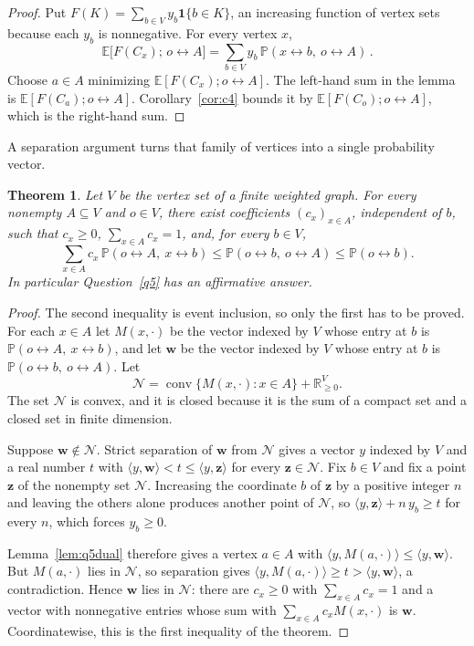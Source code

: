 \documentclass[11pt]{article}
\newtheorem{theorem}{Theorem}[section]
\theoremstyle{definition}
\theoremstyle{remark}
\newcommand{\PP}{\mathbb P}
\newcommand{\EE}{\mathbb E}
\newcommand{\one}{\mathbf 1}
\newcommand{\con}{\leftrightarrow}
\begin{document}
\begin{proof}
Put $F(K)=\sum_{b\in V}y_b\one\{b\in K\}$, an increasing function of vertex sets because
each $y_b$ is nonnegative. For every vertex $x$,
\[
 \EE\bigl[F(C_x);\,o\con A\bigr]=\sum_{b\in V}y_b\,\PP(x\con b,\ o\con A)\,.
\]
Choose $a\in A$ minimizing $\EE[F(C_x);o\con A]$. The left-hand sum in the lemma is
$\EE[F(C_a);o\con A]$. Corollary~\ref{cor:c4} bounds it by
$\EE[F(C_o);o\con A]$, which is the right-hand sum.
\end{proof}

A separation argument turns that family of vertices into a single probability vector.

\begin{theorem}\label{thm:q5}
Let $V$ be the vertex set of a finite weighted graph. For every nonempty
$A\subseteq V$ and $o\in V$, there exist coefficients $(c_x)_{x\in A}$, independent of
$b$, such that $c_x\geq0$, $\sum_{x\in A}c_x=1$, and, for every $b\in V$,
\[
 \sum_{x\in A}c_x\,\PP(o\con A,\ x\con b)
 \leq \PP(o\con b,\ o\con A)\leq \PP(o\con b).
\]
In particular Question~\ref{q5} has an affirmative answer.
\end{theorem}

\begin{proof}
The second inequality is event inclusion, so only the first has to be proved. For each
$x\in A$ let $M(x,\cdot)$ be the vector indexed by $V$ whose entry at $b$ is $\PP(o\con A,\
x\con b)$, and let $\mathbf w$ be the vector indexed by $V$ whose entry at $b$ is
$\PP(o\con b,\ o\con A)$. Let
\[
 \mathcal N=\operatorname{conv}\{M(x,\cdot):x\in A\}+\mathbb R_{\geq0}^{V}.
\]
The set $\mathcal N$ is
convex, and it is closed because it is the sum of a compact set and a closed set in finite
dimension.

Suppose $\mathbf w\notin\mathcal N$. Strict separation of $\mathbf w$ from $\mathcal N$
gives a vector $y$ indexed by $V$ and a real number $t$ with $\langle y,\mathbf
w\rangle<t\le\langle y,\mathbf z\rangle$ for every $\mathbf z\in\mathcal N$. Fix $b\in V$ and fix a point
$\mathbf z$ of the nonempty set $\mathcal N$. Increasing the coordinate $b$ of $\mathbf z$
by a positive integer $n$ and leaving the others alone produces another point of $\mathcal
N$, so $\langle y,\mathbf z\rangle+n\,y_b\ge t$ for every $n$, which forces $y_b\ge0$.

Lemma~\ref{lem:q5dual} therefore gives a vertex $a\in A$ with $\langle
y,M(a,\cdot)\rangle\le\langle y,\mathbf w\rangle$. But $M(a,\cdot)$ lies in $\mathcal N$,
so separation gives $\langle y,M(a,\cdot)\rangle\ge t>\langle y,\mathbf w\rangle$, a
contradiction. Hence $\mathbf w$ lies in $\mathcal N$: there are $c_x\ge0$ with $\sum_{x\in
A}c_x=1$ and a vector with nonnegative entries whose sum with $\sum_{x\in A}c_xM(x,\cdot)$
is $\mathbf w$. Coordinatewise, this is the first inequality of the theorem.
\end{proof}
\end{document}

